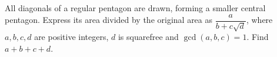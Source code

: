 All diagonals of a regular pentagon are drawn, forming a smaller central pentagon. Express its area divided by the original area as $\dfrac{a}{b+c\sqrt d}$, where $a,b,c,d$ are positive integers, $d$ is squarefree and $\gcd(a,b,c)=1$. Find $a+b+c+d$.
